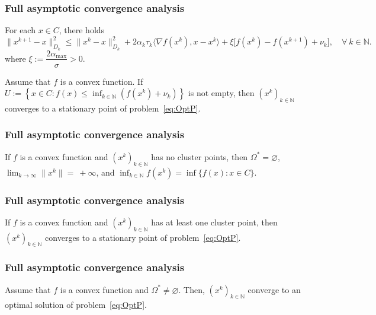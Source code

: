 \begin{frame}[c]\frametitle{Full asymptotic convergence analysis}
 \begin{lemma}
  For each  $x\in C$, there holds
  \begin{equation*}
    \|x^{k+1}-x\|_{D_k}^2 \leq \|x^k-x\|_{D_k}^2 + 2\alpha_k\tau_k \Big\langle \nabla f(x^k), x-x^k\Big\rangle + \xi \Big[f(x^k) - f(x^{k+1})+ \nu_k \Big], \quad \forall ~k \in \mathbb{N}.
  \end{equation*}
  where $\xi := \dfrac{2 \alpha_{\max}}{\sigma} > 0.$
\end{lemma}
\begin{corollary}
  Assume that $f$ is a convex function. If $U := \left\{x \in C: f(x) \leq \inf_{k\in {\mathbb N}}\left(f(x^{k})+\nu_k\right) \right\}$ is not empty, then $(x^k)_{k\in\mathbb{N}}$ converges to a stationary point of problem~\eqref{eq:OptP}.
\end{corollary}
\end{frame}


\begin{frame}[t]\frametitle{Full asymptotic convergence analysis}


\begin{theorem}
  If $f$ is a convex function and $(x^k)_{k\in\mathbb{N}}$ has no cluster points,  then $\Omega^* = \varnothing$, $\lim_{k \to \infty} \|x^k\|=~+\infty$, and $\inf_{k\in {\mathbb N}} f(x^k) = \inf \{f(x) : x \in C\}$.
\end{theorem}
\end{frame}


\begin{frame}[t]\frametitle{Full asymptotic convergence analysis}
\begin{corollary}
  If $f$ is a convex function and $(x^k)_{k\in\mathbb{N}}$ has at least one cluster point, then    $(x^k)_{k\in\mathbb{N}}$ converges to a stationary point of problem~\eqref{eq:OptP}.
\end{corollary}

\end{frame}


\begin{frame}[t]\frametitle{Full asymptotic convergence analysis}
\begin{theorem}
  Assume that $f$ is a convex function and  $\Omega^* \neq \varnothing$. Then,   $(x^k)_{k\in\mathbb{N}}$ converge to an optimal solution of problem~\eqref{eq:OptP}.
\end{theorem}
\end{frame}


